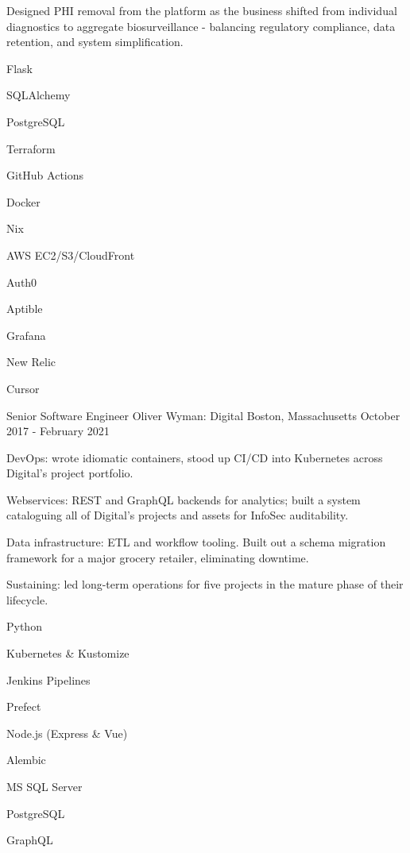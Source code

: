 \begin{cventries}
{\begin{cvitems}
    \item {Designed PHI removal from the platform as the business
        shifted from individual diagnostics to aggregate
        biosurveillance \-- balancing regulatory compliance, data
      retention, and system simplification.}
    \end{cvitems}
  }
  \begin{cventryskills}
  \item Flask
  \item SQLAlchemy
  \item PostgreSQL
  \item Terraform
  \item GitHub Actions
  \item Docker
  \item Nix
  \item AWS EC2/S3/CloudFront
  \item Auth0
  \item Aptible
  \item Grafana
  \item New Relic
  \item Cursor
  \end{cventryskills}

  \cventry%
  {Senior Software Engineer} %
  {Oliver Wyman: Digital} %
  {Boston, Massachusetts} %
  {October 2017 \-- February 2021} %
  {%
    \begin{cvitems} %
    \item {DevOps: wrote idiomatic containers, stood up CI/CD into Kubernetes across Digital's project portfolio.}
    \item {Webservices: REST and GraphQL backends for analytics; built a system cataloguing all of Digital's projects and assets for InfoSec auditability.}
    \item {Data infrastructure: ETL and workflow tooling. Built out a schema migration framework for a major grocery retailer, eliminating downtime.}
    \item {Sustaining: led long-term operations for five projects in the mature phase of their lifecycle.}
    \end{cvitems}
  }
  \begin{cventryskills}
  \item Python
  \item Kubernetes \& Kustomize
  \item Jenkins Pipelines
  \item Prefect
  \item Node.js (Express \& Vue)
  \item Alembic
  \item MS SQL Server
  \item PostgreSQL
  \item GraphQL
  \end{cventryskills}


\end{cventries}
